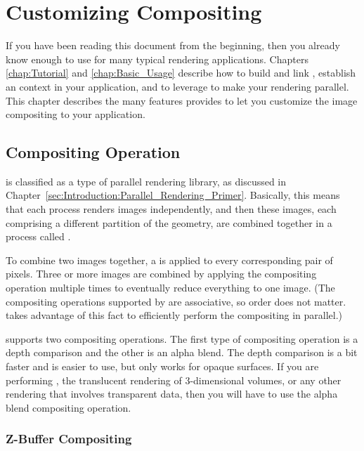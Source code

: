 
\chapter{Customizing Compositing}
\label{chap:Customizing_Compositing}

If you have been reading this document from the beginning, then you already
know enough to use \IceT for many typical rendering applications.  Chapters
\ref{chap:Tutorial} and \ref{chap:Basic_Usage} describe how to build and
link \IceT, establish an \IceT context in your application, and to leverage
\IceT to make your rendering parallel.  This chapter describes the many
features \IceT provides to let you customize the image compositing to your
application.

\section{Compositing Operation}
\label{sec:Customizing_Compositing:Compositing_Operation}

\IceT is classified as a  type of
parallel rendering library, as discussed in
Chapter~\ref{sec:Introduction:Parallel_Rendering_Primer}.  Basically, this
means that each process renders images independently, and then these
images, each comprising a different partition of the geometry, are combined
together in a process called .

To combine two images together, a  is
applied to every corresponding pair of pixels.  Three or more images are
combined by applying the compositing operation multiple times to eventually
reduce everything to one image.  (The compositing operations supported by
\IceT are associative, so order does not matter.  \IceT takes advantage of
this fact to efficiently perform the compositing in parallel.)

\IceT supports two compositing operations.  The first type of compositing
operation is a depth comparison and the other is an alpha blend.    The
depth comparison is a bit faster and is easier to use, but only works for
opaque surfaces.  If you are performing
, the translucent
rendering of 3-dimensional volumes, or any other rendering that involves
transparent data, then you will have to use the alpha blend compositing
operation.

\subsection{Z-Buffer Compositing}
\label{sec:Customizing_Compositing:User_Defined_Communicators}


